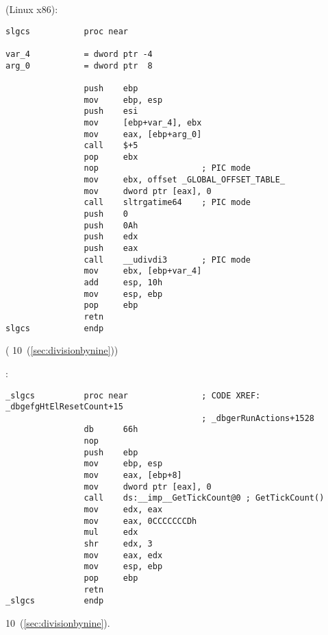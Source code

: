   (Linux x86):

\begin{lstlisting}
slgcs           proc near

var_4           = dword ptr -4
arg_0           = dword ptr  8

                push    ebp
                mov     ebp, esp
                push    esi
                mov     [ebp+var_4], ebx
                mov     eax, [ebp+arg_0]
                call    $+5
                pop     ebx
                nop                     ; PIC mode
                mov     ebx, offset _GLOBAL_OFFSET_TABLE_
                mov     dword ptr [eax], 0
                call    sltrgatime64    ; PIC mode
                push    0
                push    0Ah
                push    edx
                push    eax
                call    __udivdi3       ; PIC mode
                mov     ebx, [ebp+var_4]
                add     esp, 10h
                mov     esp, ebp
                pop     ebp
                retn
slgcs           endp
\end{lstlisting}

(  
 10~(\ref{sec:divisionbynine}))

:

\begin{lstlisting}
_slgcs          proc near               ; CODE XREF: _dbgefgHtElResetCount+15
                                        ; _dbgerRunActions+1528
                db      66h
                nop
                push    ebp
                mov     ebp, esp
                mov     eax, [ebp+8]
                mov     dword ptr [eax], 0
                call    ds:__imp__GetTickCount@0 ; GetTickCount()
                mov     edx, eax
                mov     eax, 0CCCCCCCDh
                mul     edx
                shr     edx, 3
                mov     eax, edx
                mov     esp, ebp
                pop     ebp
                retn
_slgcs          endp
\end{lstlisting}

  
 10~(\ref{sec:divisionbynine}).

